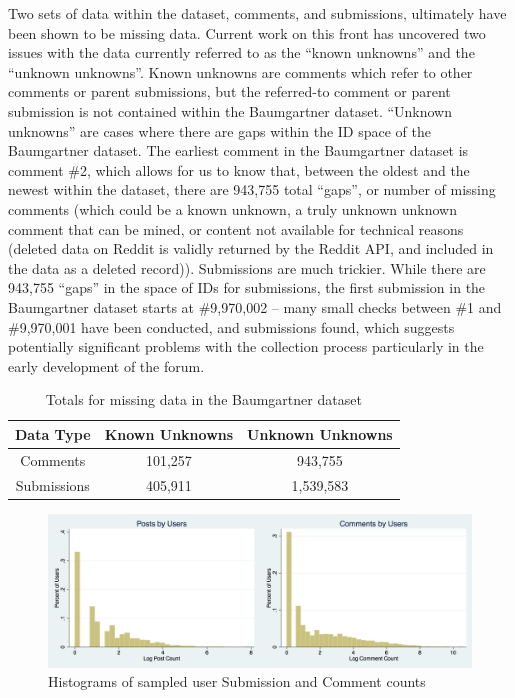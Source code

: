 \documentclass[letterpaper,12pt]{article}
\begin{document}
Two sets of data within the dataset, comments, and submissions, ultimately have been shown to be missing data. Current work on this front has uncovered two issues with the data currently referred to as the ``known unknowns'' and the ``unknown unknowns''. Known unknowns are comments which refer to other comments or parent submissions, but the referred-to comment or parent submission is not contained within the Baumgartner dataset. ``Unknown unknowns'' are cases where there are gaps within the ID space of the Baumgartner dataset. The earliest comment in the  Baumgartner dataset is comment \#2, which allows for us to know that, between the oldest and the newest within the dataset, there are 943,755 total ``gaps'', or number of missing comments (which could be a known unknown, a truly unknown unknown comment that can be mined, or content not available for technical reasons (deleted data on Reddit is validly returned by the Reddit API, and included in the data as a deleted record)). Submissions are much trickier. While there are 943,755 ``gaps'' in the space of IDs for submissions, the first submission in the Baumgartner dataset starts at \#9,970,002 -- many small checks between \#1 and \#9,970,001 have been conducted, and submissions found, which suggests potentially significant problems with the collection process particularly in the early development of the forum. 
\begin{table}
  \begin{center}
    \begin{tabular}{ |c|c|c| } 
      \hline
      Data Type & Known Unknowns & Unknown Unknowns \\
      \hline
      Comments & 101,257 & 943,755 \\ 
      Submissions & 405,911 & 1,539,583 \\ 
      \hline
    \end{tabular}
  \end{center}
  \caption{Totals for missing data in the Baumgartner dataset}
  \label{table:total_missing}
\end{table}

\begin{figure}[h]
  \centering
  \includegraphics[width=\textwidth]{post_counts}
  \caption{Histograms of sampled user Submission and Comment counts}
  \label{fig:post_counts}
\end{figure}
\end{document}
